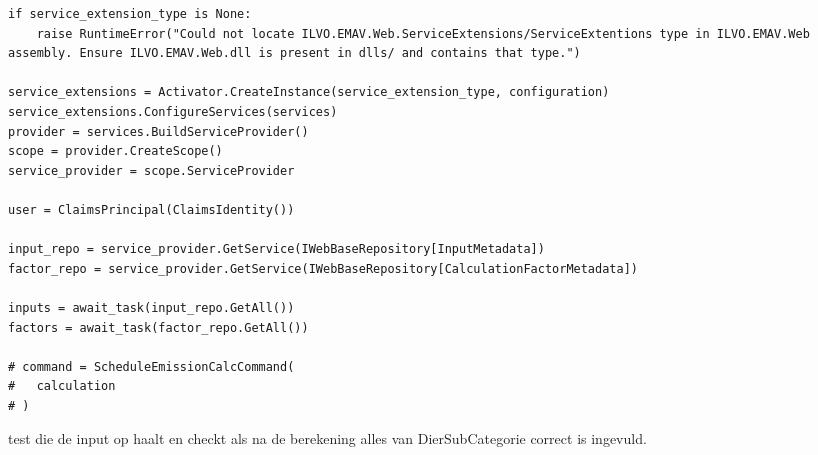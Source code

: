 \begin{verbatim}
if service_extension_type is None:
    raise RuntimeError("Could not locate ILVO.EMAV.Web.ServiceExtensions/ServiceExtentions type in ILVO.EMAV.Web assembly. Ensure ILVO.EMAV.Web.dll is present in dlls/ and contains that type.")

service_extensions = Activator.CreateInstance(service_extension_type, configuration)
service_extensions.ConfigureServices(services)
provider = services.BuildServiceProvider()
scope = provider.CreateScope()
service_provider = scope.ServiceProvider

user = ClaimsPrincipal(ClaimsIdentity())

input_repo = service_provider.GetService(IWebBaseRepository[InputMetadata])
factor_repo = service_provider.GetService(IWebBaseRepository[CalculationFactorMetadata])

inputs = await_task(input_repo.GetAll())
factors = await_task(factor_repo.GetAll())

# command = ScheduleEmissionCalcCommand(
#   calculation
# )

  \end{verbatim}

\begin{listing}[H]
   \caption[integratie test]{test die de input op haalt en checkt als na de berekening alles van DierSubCategorie correct is ingevuld.}
  \label{lst:inttest}
\end{listing}

